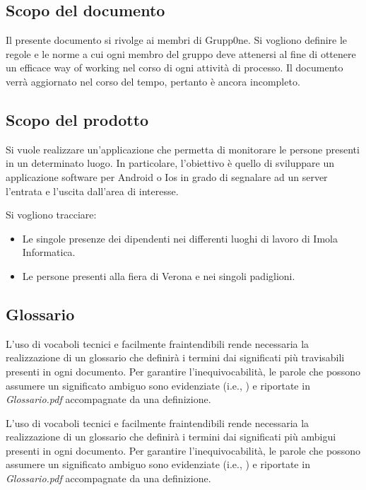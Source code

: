 \documentclass[../norme-di-progetto.tex]{subfiles}
\begin{document}
\subsection{Scopo del documento}%
\label{sub:scopo del documento}

Il presente documento si rivolge ai membri di Grupp0ne.
Si vogliono definire le regole e le norme a cui ogni membro del gruppo deve attenersi al fine di ottenere un efficace way of working nel corso di ogni attività di processo.
Il documento verrà aggiornato nel corso del tempo, pertanto è ancora incompleto.

\subsection{Scopo del prodotto}%
\label{sub:scopo del prodotto}

Si vuole realizzare un'applicazione che permetta di monitorare le persone presenti in un determinato luogo.
In particolare, l'obiettivo è quello di sviluppare un applicazione software per Android o Ios in grado di segnalare ad un server l'entrata e l'uscita dall'area di interesse.

Si vogliono tracciare:

\begin{itemize}
  \item Le singole presenze dei dipendenti nei differenti luoghi di lavoro di Imola Informatica.
  \item Le persone presenti alla fiera di Verona e nei singoli padiglioni.
\end{itemize}

\subsection{Glossario}%
\label{sub:glossario}
L'uso di vocaboli tecnici e facilmente fraintendibili rende necessaria la realizzazione di un glossario che definirà i termini dai significati più travisabili presenti in ogni documento.
Per garantire l'inequivocabilità, le parole che possono assumere un significato ambiguo sono evidenziate (i.e., ) e riportate in \textit{Glossario.pdf} accompagnate da una definizione.

L'uso di vocaboli tecnici e facilmente fraintendibili rende necessaria la realizzazione di un glossario che definirà i termini dai significati più ambigui presenti in ogni documento.
Per garantire l'inequivocabilità, le parole che possono assumere un significato ambiguo sono evidenziate (i.e., ) e riportate in \textit{Glossario.pdf} accompagnate da una definizione.
\end{document}
